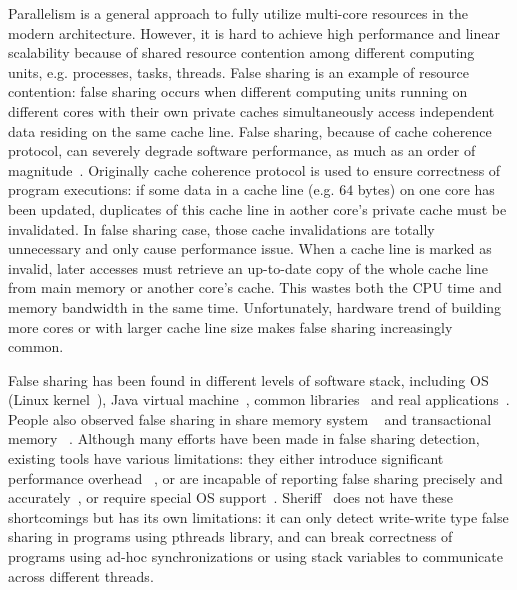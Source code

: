 
\label{sec:intro} 

Parallelism is a general approach to fully utilize multi-core resources in the modern architecture. 
However, it is hard to achieve high performance and linear scalability because of shared 
resource contention among different computing units, e.g. processes, tasks, threads.
False sharing is an example of resource contention: false sharing occurs when 
different computing units running on different cores with their own private caches 
simultaneously access independent data residing on the same cache line.
False sharing, because of cache coherence protocol, can severely degrade software 
performance, as much as an order of magnitude~\cite{falseshareeffect}.
Originally cache coherence protocol is used to ensure correctness of program executions: 
if some data in a cache line (e.g. $64$ bytes) on one core has been updated, 
duplicates of this cache line in aother core's private 
cache must be invalidated. 
In false sharing case, those cache invalidations are totally unnecessary and only
cause performance issue. 
When a cache line is marked as invalid, 
later accesses must retrieve an up-to-date copy of the whole cache line 
from main memory or another core's cache.
This wastes both the CPU time and memory bandwidth in the same time. 
Unfortunately, hardware trend of building more cores
or with larger cache line size makes false sharing increasingly common.

False sharing has been found in different levels of software stack, including
OS (Linux kernel~\cite{OSfalsesharing}), Java virtual machine~\cite{JVMfalsesharing}, 
common libraries~\cite{libfalsesharing} and real applications~\cite{appfalsesharing, mysql}. 
People also observed false sharing in share memory system
~\cite{dsmfalsesharing} and transactional memory ~\cite{tmfalsesharing}.
Although many efforts have been made in false sharing detection, existing
tools have various limitations:
they either introduce significant performance overhead~
\cite{falseshare:simulator, falseshare:binaryinstrumentation1,falseshare:binaryinstrumentation2}, or 
are incapable of reporting false sharing 
precisely and accurately~\cite{qinzhaodetection, detect:ptu, detect:intel, falseshare:binaryinstrumentation1, DProf, falseshare:binaryinstrumentation2}, 
or require special OS support~\cite{OSdetection}.
Sheriff~\cite{sheriff} does not have these shortcomings but has its own limitations: 
it can only detect write-write type false sharing in programs using pthreads library,
and can break correctness of programs using ad-hoc synchronizations or using stack variables to 
communicate across different threads. 

